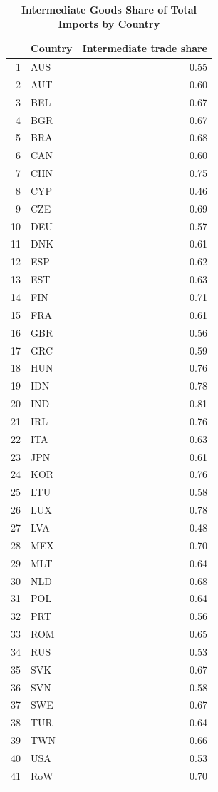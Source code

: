 \documentclass[12pt]{article}
\begin{document}
\begin{table}[!htbp]
\caption{\textbf{Intermediate Goods Share of Total Imports by Country}}
\centering
\begin{tabular}{rlr}
  \hline
 & Country & Intermediate trade share \\ 
  \hline
1 & AUS & 0.55 \\ 
  2 & AUT & 0.60 \\ 
  3 & BEL & 0.67 \\ 
  4 & BGR & 0.67 \\ 
  5 & BRA & 0.68 \\ 
  6 & CAN & 0.60 \\ 
  7 & CHN & 0.75 \\ 
  8 & CYP & 0.46 \\ 
  9 & CZE & 0.69 \\ 
  10 & DEU & 0.57 \\ 
  11 & DNK & 0.61 \\ 
  12 & ESP & 0.62 \\ 
  13 & EST & 0.63 \\ 
  14 & FIN & 0.71 \\ 
  15 & FRA & 0.61 \\ 
  16 & GBR & 0.56 \\ 
  17 & GRC & 0.59 \\ 
  18 & HUN & 0.76 \\ 
  19 & IDN & 0.78 \\ 
  20 & IND & 0.81 \\ 
  21 & IRL & 0.76 \\ 
  22 & ITA & 0.63 \\ 
  23 & JPN & 0.61 \\ 
  24 & KOR & 0.76 \\ 
  25 & LTU & 0.58 \\ 
  26 & LUX & 0.78 \\ 
  27 & LVA & 0.48 \\ 
  28 & MEX & 0.70 \\ 
  29 & MLT & 0.64 \\ 
  30 & NLD & 0.68 \\ 
  31 & POL & 0.64 \\ 
  32 & PRT & 0.56 \\ 
  33 & ROM & 0.65 \\ 
  34 & RUS & 0.53 \\ 
  35 & SVK & 0.67 \\ 
  36 & SVN & 0.58 \\ 
  37 & SWE & 0.67 \\ 
  38 & TUR & 0.64 \\ 
  39 & TWN & 0.66 \\ 
  40 & USA & 0.53 \\ 
  41 & RoW & 0.70 \\ 
   \hline
\end{tabular}
\end{table}
\end{document}
